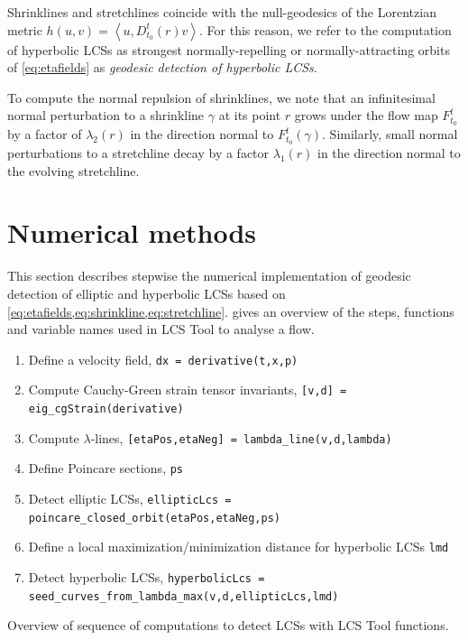\documentclass[5p]{elsarticle}
\begin{document}
\begin{sloppypar}
Shrinklines and stretchlines coincide with the null-geodesics of the Lorentzian metric $h(u,v) = \left\langle u,D_{t_0}^t(r) v \right\rangle$. For this reason, we refer to the computation of hyperbolic LCSs as strongest normally-repelling or normally-attracting orbits of \cref{eq:etafields} as \emph{geodesic detection of hyperbolic LCSs}.
\end{sloppypar}

To compute the normal repulsion of shrinklines, we note that an infinitesimal
normal perturbation to a shrinkline $\gamma$ at its point $r$ grows under the flow map $F_{t_{0}}^{t}$ by a factor of $\lambda_{2}(r)$ in the direction normal to $F_{t_{0}}^{t}(\gamma).$ Similarly, small normal perturbations to a stretchline decay by a factor $\lambda_{1}(r)$ in the direction normal to the evolving stretchline. 

\section{Numerical methods}

This section describes stepwise the numerical implementation of geodesic detection of elliptic and hyperbolic LCSs based on \cref{eq:etafields,eq:shrinkline,eq:stretchline}.  gives an overview of the steps, functions and variable names used in LCS Tool to analyse a flow.

\begin{table}
\begin{enumerate}
\item Define a velocity field, \lstinline!dx = derivative(t,x,p)!
\item Compute Cauchy-Green strain tensor invariants, \lstinline![v,d] = eig_cgStrain(derivative)!
\item Compute $\lambda$-lines, \lstinline![etaPos,etaNeg] = lambda_line(v,d,lambda)!
\item Define Poincare sections, \lstinline!ps!
\item Detect elliptic LCSs, \lstinline!ellipticLcs = poincare_closed_orbit(etaPos,etaNeg,ps)!
\item Define a local maximization/minimization distance for hyperbolic LCSs \lstinline!lmd!
\item Detect hyperbolic LCSs, \lstinline!hyperbolicLcs = seed_curves_from_lambda_max(v,d,ellipticLcs,lmd)!
\end{enumerate}
\caption{Overview of sequence of computations to detect LCSs with LCS Tool functions.}
\label{t:LCS Tool overview}
\end{table}
\end{document}
